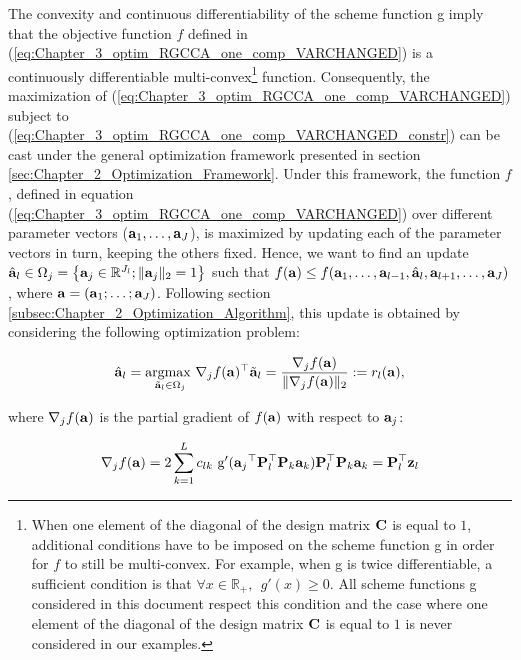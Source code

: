 \documentclass[
]{jss}
\begin{document}
The convexity and continuous differentiability of the scheme function g
imply that the objective function \(f\) defined in
(\ref{eq:Chapter_3_optim_RGCCA_one_comp_VARCHANGED}) is a continuously
differentiable
multi-convex\footnote{When one element of the diagonal of the design matrix $\mathbf{C}$ is equal to $1$, additional conditions have to be imposed on the scheme function g in order for $f$ to still be multi-convex. For example, when g is twice differentiable, a sufficient condition is that $\forall x\in\mathbb{R}_+, ~~g'(x)\geq 0$. All scheme functions g considered in this document respect this condition and the case where one element of the diagonal of the design matrix $\mathbf{C}$ is equal to $1$ is never considered in our examples.}
function. Consequently, the maximization of
(\ref{eq:Chapter_3_optim_RGCCA_one_comp_VARCHANGED}) subject to
(\ref{eq:Chapter_3_optim_RGCCA_one_comp_VARCHANGED_constr}) can be cast
under the general optimization framework presented in section
\ref{sec:Chapter_2_Optimization_Framework}. Under this framework, the
function \(f\), defined in equation
(\ref{eq:Chapter_3_optim_RGCCA_one_comp_VARCHANGED}) over different
parameter vectors (\(\mathbf{a}_1, \ldots,\mathbf{a}_J\)), is maximized by
updating each of the parameter vectors in turn, keeping the others
fixed. Hence, we want to find an update
\(\hat{\mathbf{a}}_l\in \Omega_j=\left\lbrace \mathbf{a}_j \in \mathbb{R}^{J_l}; \Vert \mathbf{a}_j \Vert_2 = 1 \right\rbrace\)
such that
\(f(\mathbf{a})\leq f(\mathbf{a}_1, \ldots, \mathbf{a}_{l-1}, \hat{\mathbf{a}}_l, \mathbf{a}_{l+1}, \ldots, \mathbf{a}_J)\),
where \(\mathbf{a} = (\mathbf{a}_1; \ldots ;\mathbf{a}_J)\). Following section
\ref{subsec:Chapter_2_Optimization_Algorithm}, this update is obtained
by considering the following optimization problem:

\begin{equation}
    \hat{\mathbf{a}}_l = \underset{\tilde{\mathbf{a}}_l\in\Omega_j}{\mathrm{argmax~}}  \nabla_j f(\mathbf{a})^\top \tilde{\mathbf{a}}_l = \frac{\nabla_j f(\mathbf{a})}{\Vert \nabla_j f(\mathbf{a}) \Vert_2} := r_l(\mathbf{a}),
\label{eq:Chapter_3_update_RGCCA_one_comp}
\end{equation}

where \(\nabla_j f(\mathbf{a})\) is the partial gradient of \(f(\mathbf{a})\) with
respect to \(\mathbf{a}_j\):

\begin{equation}
    \displaystyle \nabla_j f(\mathbf{a}) = 2\sum_{\substack{k=1}}^{L}c_{lk} \text{ g}'({\mathbf{a}_j}^\top\mathbf{P}_l^\top\mathbf{P}_k\mathbf{a}_k)\mathbf{P}_l^\top\mathbf{P}_k\mathbf{a}_k = \mathbf{P}_l^\top \mathbf{z}_l
\label{eq:Chapter_3_sub_grad_RGCCA_one_comp}
\end{equation}
\end{document}
